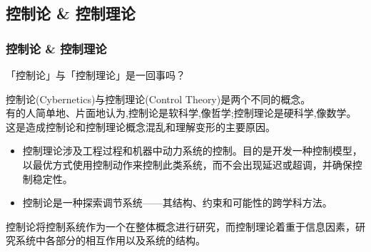 \documentclass[12pt,AutoFakeBold,aspectratio=43,mathserif]{beamer}
\begin{document}
\begin{frame}
\begin{columns}
\begin{column}{.4\linewidth}
    \subsection{控制论 \& 控制理论}
    \begin{frame}
        \frametitle{控制论 \& 控制理论}
        \begin{block}{\textnormal{「控制论」与「控制理论」是一回事吗？}}
        \end{block} \pause
        \footnotesize
        控制论(Cybernetics)与控制理论(Control Theory)是两个不同的概念。 \\
        有的人简单地、片面地认为,控制论是软科学,像哲学;控制理论是硬科学,像数学。这是造成控制论和控制理论概念混乱和理解变形的主要原因。 \\
        \begin{itemize}
            \item 控制理论涉及工程过程和机器中动力系统的控制。目的是开发一种控制模型，以最优方式使用控制动作来控制此类系统，而不会出现延迟或超调，并确保控制稳定性。\pause
            \item 控制论是一种探索调节系统——其结构、约束和可能性的跨学科方法。\pause
        \end{itemize}
        控制论将控制系统作为一个在整体概念进行研究，而控制理论着重于信息因素，研究系统中各部分的相互作用以及系统的结构。
        \pause
        
    
    \end{frame}

\end{column}
\end{columns}
\end{frame}
\end{document}
